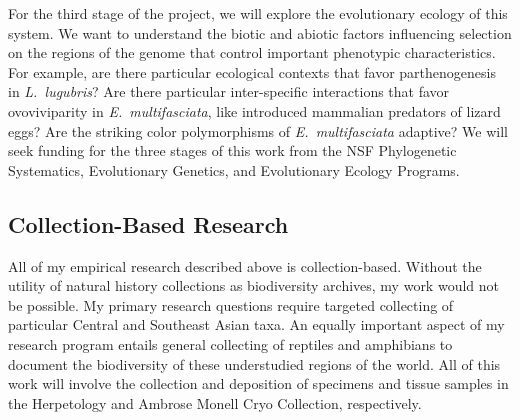 For the third stage of the project, we will explore the evolutionary ecology of
this system.
We want to understand the biotic and abiotic factors influencing selection on
the regions of the genome that control important phenotypic characteristics.
For example, are there particular ecological contexts that favor
parthenogenesis in \emph{L.\ lugubris}?
Are there particular inter-specific interactions that favor ovoviviparity in
\emph{E.\ multifasciata}, like introduced mammalian predators of lizard eggs?
Are the striking color polymorphisms of \emph{E.\ multifasciata} adaptive?
We will seek funding for the three stages of this work from the NSF
Phylogenetic Systematics, Evolutionary Genetics, and Evolutionary Ecology
Programs.


\subsection*{Collection-Based Research}
All of my empirical research described above is collection-based.
Without the utility of natural history collections as biodiversity archives,
my work would not be possible.
My primary research questions require targeted collecting of particular
Central and Southeast Asian taxa.
An equally important aspect of my research program entails general 
collecting of reptiles and amphibians to document the biodiversity of
these understudied regions of the world.
All of this work will involve the collection and deposition of specimens and
tissue samples in the Herpetology and Ambrose Monell Cryo Collection,
respectively.

